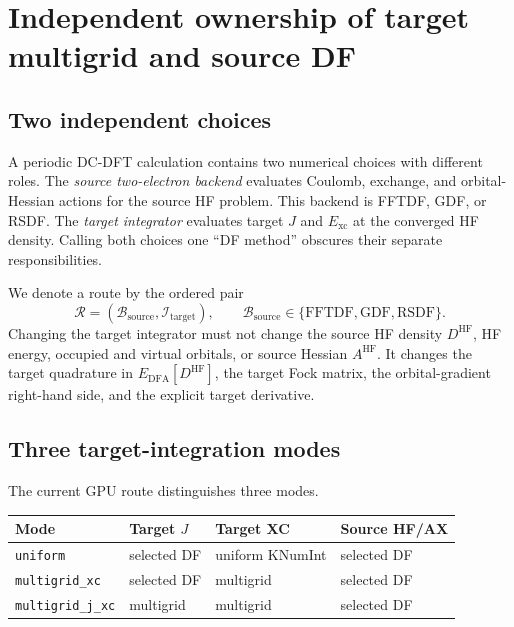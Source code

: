 \section{Independent ownership of target multigrid and source DF}
\label{sec:target-multigrid}

\subsection{Two independent choices}

A periodic DC-DFT calculation contains two numerical choices with different
roles.  The \emph{source two-electron backend} evaluates Coulomb, exchange,
and orbital-Hessian actions for the source HF problem.  This backend is
FFTDF, GDF, or RSDF.  The \emph{target integrator} evaluates target $J$ and
$E_{\mathrm{xc}}$ at the converged HF density.  Calling both choices one
``DF method'' obscures their separate responsibilities.

We denote a route by the ordered pair
\begin{equation}
  \mathcal R
  =\left(\mathcal B_{\mathrm{source}},\mathcal I_{\mathrm{target}}\right),
  \qquad
  \mathcal B_{\mathrm{source}}\in\{\mathrm{FFTDF},\mathrm{GDF},\mathrm{RSDF}\}.
  \label{eq:target-owner-split}
\end{equation}
Changing the target integrator must not change the source HF density
$D^{\mathrm{HF}}$, HF energy, occupied and virtual orbitals, or source Hessian
$A^{\mathrm{HF}}$.  It changes the target quadrature in
$E_{\mathrm{DFA}}[D^{\mathrm{HF}}]$, the target Fock matrix, the orbital-gradient
right-hand side, and the explicit target derivative.

\subsection{Three target-integration modes}

The current GPU route distinguishes three modes.

\begin{center}
\begin{longtable}{p{}p{}p{}p{}}
\toprule
Mode & Target $J$ & Target XC & Source HF/AX \\
\midrule
\texttt{uniform} & selected DF & uniform KNumInt & selected DF \\
\texttt{multigrid\_xc} & selected DF & multigrid & selected DF \\
\texttt{multigrid\_j\_xc} & multigrid & multigrid & selected DF \\
\bottomrule
\end{longtable}
\end{center}

